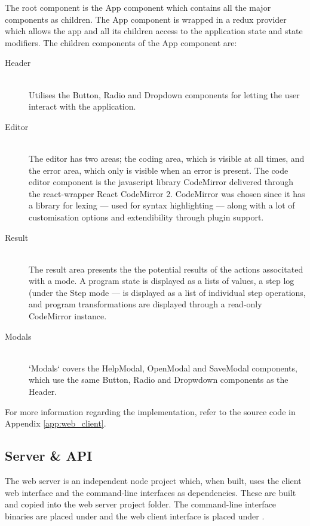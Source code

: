 The root component is the App component which contains all the major components as children.
The App component is wrapped in a redux provider which allows the app and all its children access to the application state and state modifiers.
The children components of the App component are:
\begin{description}

  \item[Header]~\\
    Utilises the Button, Radio and Dropdown components for letting the user interact with the application.

  \item[Editor]~\\
    The editor has two areas; the coding area, which is visible at all times, and the error area, which only is visible when an error is present.
    The code editor component is the javascript library CodeMirror \cite{CM} delivered through the react-wrapper React CodeMirror 2.
    CodeMirror was chosen since it has a library for lexing --- used for syntax highlighting --- along with a lot of customisation options and extendibility through plugin support.

  \item[Result]~\\
    The result area presents the the potential results of the actions associtated with a mode. A program state is displayed as a lists of values, a step log (under the Step mode --- is displayed as a list of individual step operations, and program transformations are displayed through a read-only CodeMirror instance.

  \item[Modals]~\\
    `Modals` covers the HelpModal, OpenModal and SaveModal components, which use the same Button, Radio and Dropwdown components as the Header.

\end{description}
For more information regarding the implementation, refer to the source code in Appendix \ref{app:web_client}.



\subsection{Server \& API}
\label{sec:server_and_api}

The web server is an independent node project which, when built, uses the client web interface and the command-line interfaces as dependencies.
These are built and copied into the web server project folder.
The command-line interface binaries are placed under  and the web client interface is placed under .


